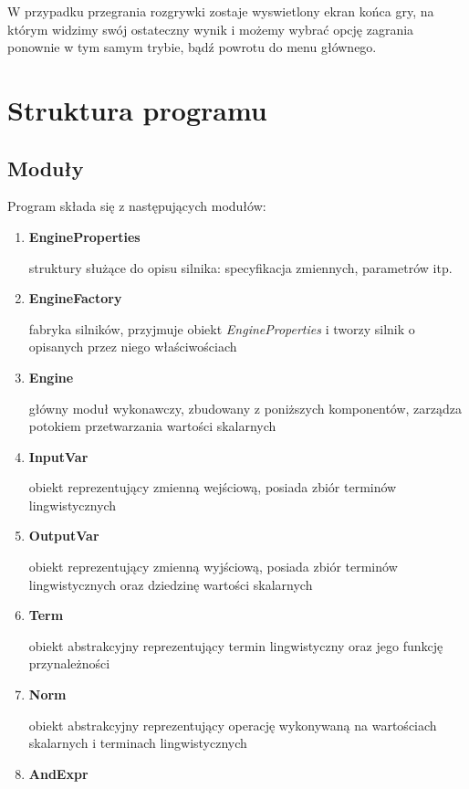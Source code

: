 \documentclass{article}
\begin{document}
W przypadku przegrania rozgrywki zostaje wyswietlony ekran końca gry, na którym widzimy swój
ostateczny wynik i możemy wybrać opcję zagrania ponownie w tym samym trybie, bądź powrotu
do menu głównego.

\section {Struktura programu}

\subsection {Moduły}

Program składa się z następujących modułów:

\begin{enumerate}
\item \textbf{EngineProperties}

  struktury służące do opisu silnika: specyfikacja zmiennych, parametrów itp.

\item \textbf{EngineFactory}

  fabryka silników, przyjmuje obiekt \emph{EngineProperties} i tworzy silnik o
  opisanych przez niego właściwościach

\item \textbf{Engine}

  główny moduł wykonawczy, zbudowany z poniższych komponentów, zarządza potokiem
  przetwarzania wartości skalarnych

\item \textbf{InputVar}

  obiekt reprezentujący zmienną wejściową, posiada zbiór terminów
  lingwistycznych

\item \textbf{OutputVar}

  obiekt reprezentujący zmienną wyjściową, posiada zbiór terminów
  lingwistycznych oraz dziedzinę wartości skalarnych

\item \textbf{Term}

  obiekt abstrakcyjny reprezentujący termin lingwistyczny oraz jego
  funkcję przynależności

\item \textbf{Norm}

  obiekt abstrakcyjny reprezentujący operację wykonywaną na wartościach
  skalarnych i terminach lingwistycznych

\item \textbf{AndExpr}


\end{enumerate}
\end{document}
